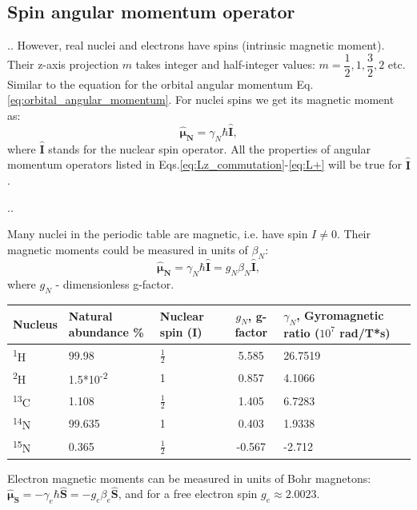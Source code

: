 \documentclass[handout]{beamer}
\begin{document}
\subsection{Spin angular momentum operator}
\begin{frame}{\thesection.\thesubsection. \insertsubsection}
	However, real nuclei and electrons have spins (intrinsic magnetic moment). Their z-axis projection $m$ takes integer and half-integer values: $m=\dfrac{1}{2}, 1, \dfrac{3}{2}, 2$ etc. Similar to the equation for the orbital angular momentum Eq.\ref{eq:orbital_angular_momentum}. For nuclei spins we get its magnetic moment as:
	\begin{equation}
		\bm{\hat{\mu}_N} = \gamma_N \hbar \bm{\hat{I}},
	\end{equation}
	where $ \bm{\hat{I}}$ stands for the nuclear spin operator. All the properties of angular momentum operators listed in Eqs.\ref{eq:Lz_commutation}-\ref*{eq:L+} will be true for $ \bm{\hat{I}}$.
\end{frame}

\begin{frame}{\thesection.\thesubsection. \insertsubsection}

 	Many nuclei in the periodic table are magnetic, i.e. have spin $I \neq 0$. Their magnetic moments could be measured in units of $\beta_N$:
		\begin{equation}
		\bm{\hat{\mu}_N} = \gamma_N \hbar \bm{\hat{I}} = g_N \beta_N \bm{\hat{I}},
		\end{equation}
		where $g_N$ - dimensionless g-factor.
		\onslide<2->
\begin{table}[ht]
	\centering
	\begin{tabular}{  C{1.0cm}  C{2.0cm}  C{1.0cm}  C{2.cm}  C{3cm}}
		\hline\hline
		Nucleus & Natural abundance \% & Nuclear spin (I) & $g_N$, g-factor & $\gamma_N$, Gyromagnetic ratio ($10^7$ rad/T*s) \\
		\hline
		\textsuperscript{1}H & 99.98 & $\frac{1}{2}$ & 5.585 & 26.7519 \\
		\textsuperscript{2}H & 1.5*10\textsuperscript{-2} & 1 & 0.857 & 4.1066 \\
		\textsuperscript{13}C & 1.108 & $\frac{1}{2}$ & 1.405 & 6.7283 \\
		\textsuperscript{14}N & 99.635 & 1 & 0.403 & 1.9338 \\
		\textsuperscript{15}N & 0.365 &  $\frac{1}{2}$ & -0.567 & -2.712 \\
		\hline
	\end{tabular}
	\label{tab:mag_properties}		
\end{table}
    Electron magnetic moments can be measured in units of Bohr magnetons: $\bm{\hat{\mu}_S} = -\gamma_e \hbar \bm{\hat{S}} = -g_e \beta_e \bm{\hat{S}}$, and for a free electron spin $g_e \approx 2.0023$.		

\end{frame}
\end{document}
